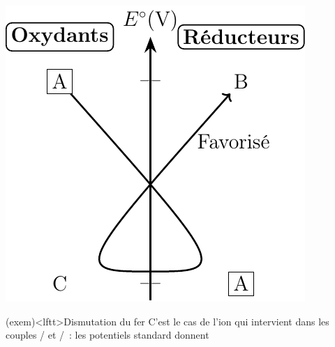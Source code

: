 \documentclass[../../main/main.tex]{subfiles}
\begin{document}
\begin{tcb*}[sidebyside, righthand ratio=.3]
\begin{center}
{    \includegraphics[width=\linewidth]{estand_dismut}
    }
  \end{center}
\end{tcb*}

\begin{tcb*}(exem)<lftt>{Dismutation du fer}
    C'est le cas de l'ion  qui intervient dans les couples
    / et /~: les potentiels standard
    donnent
    \psw{
      \[
        \ce{2 {Fe}^2+_{\rm(aq)} + Fe_{\rm(s)} = 3 {Fe}^2+_{\rm(aq)}}
      \]
    }
\end{tcb*}
\end{document}
